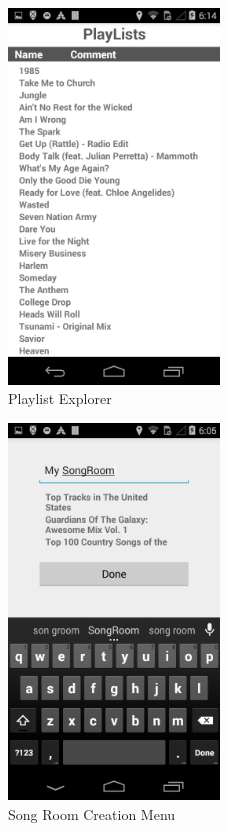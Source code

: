 \documentclass[12pt]{article}
\begin{document}
\begin{figure}[h]
  \centering
    \includegraphics[width=0.5\textwidth]{playlists}
    \caption{Playlist Explorer}
\end{figure}

\begin{figure}[h]
  \centering
    \includegraphics[width=0.5\textwidth]{create-sr}
    \caption{Song Room Creation Menu}
\end{figure}
\end{document}

